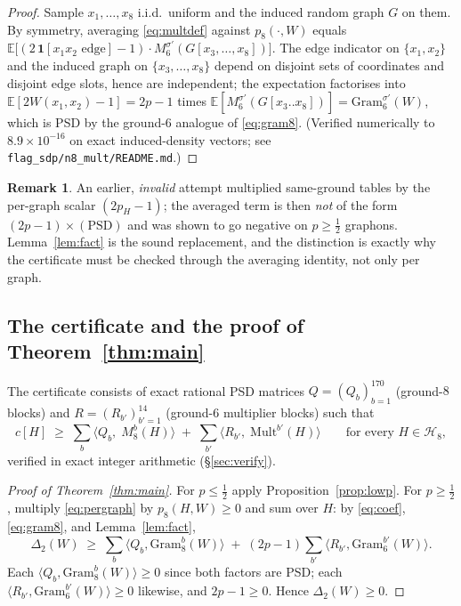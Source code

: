 \documentclass[11pt]{article}
\theoremstyle{definition}
\newtheorem{remark}[theorem]{Remark}
\newcommand{\E}{\mathbb E}
\begin{document}
\begin{proof}
Sample $x_1,\dots,x_8$ i.i.d.\ uniform and the induced random graph $G$ on
them.  By symmetry, averaging \eqref{eq:multdef} against $p_8(\cdot,W)$ equals
$\E\big[(2\,\mathbf 1[x_1x_2\text{ edge}]-1)\cdot
M^{\sigma'}_6(G[x_3,\dots,x_8])\big]$.  The edge indicator on $\{x_1,x_2\}$
and the induced graph on $\{x_3,\dots,x_8\}$ depend on disjoint sets of
coordinates and disjoint edge slots, hence are independent; the expectation
factorises into $\E[2W(x_1,x_2)-1]=2p-1$ times
$\E[M^{\sigma'}_6(G[x_3..x_8])]=\mathrm{Gram}_6^{\sigma'}(W)$, which is PSD by
the ground-$6$ analogue of \eqref{eq:gram8}.  (Verified numerically to
$8.9\times10^{-16}$ on exact induced-density vectors; see
\texttt{flag\_sdp/n8\_mult/README.md}.)
\end{proof}

\begin{remark}
An earlier, \emph{invalid} attempt multiplied same-ground tables by the
per-graph scalar $(2p_H-1)$; the averaged term is then \emph{not} of the form
$(2p-1)\times(\text{PSD})$ and was shown to go negative on $p\ge\tfrac12$
graphons.  Lemma~\ref{lem:fact} is the sound replacement, and the distinction
is exactly why the certificate must be checked through the averaging identity,
not only per graph.
\end{remark}

\subsection{The certificate and the proof of Theorem~\ref{thm:main}}

The certificate consists of exact rational PSD matrices
$Q=(Q_b)_{b=1}^{170}$ (ground-$8$ blocks) and $R=(R_{b'})_{b'=1}^{14}$
(ground-$6$ multiplier blocks) such that
\begin{equation}\label{eq:pergraph}
  c[H]\;\ge\;\sum_{b}\big\langle Q_b,\;M_8^{b}(H)\big\rangle
  \;+\;\sum_{b'}\big\langle R_{b'},\;\mathrm{Mult}^{b'}(H)\big\rangle
  \qquad\text{for every } H\in\mathcal H_8 ,
\end{equation}
verified in exact integer arithmetic (\S\ref{sec:verify}).

\begin{proof}[Proof of Theorem~\ref{thm:main}]
For $p\le\tfrac12$ apply Proposition~\ref{prop:lowp}.  For $p\ge\tfrac12$,
multiply \eqref{eq:pergraph} by $p_8(H,W)\ge0$ and sum over $H$: by
\eqref{eq:coef}, \eqref{eq:gram8}, and Lemma~\ref{lem:fact},
\[
  \Delta_2(W)\;\ge\;\sum_b\big\langle Q_b,\mathrm{Gram}_8^{b}(W)\big\rangle
  \;+\;(2p-1)\sum_{b'}\big\langle R_{b'},\mathrm{Gram}_6^{b'}(W)\big\rangle .
\]
Each $\langle Q_b,\mathrm{Gram}_8^b(W)\rangle\ge0$ since both factors are PSD;
each $\langle R_{b'},\mathrm{Gram}_6^{b'}(W)\rangle\ge0$ likewise, and
$2p-1\ge0$.  Hence $\Delta_2(W)\ge0$.
\end{proof}
\end{document}
